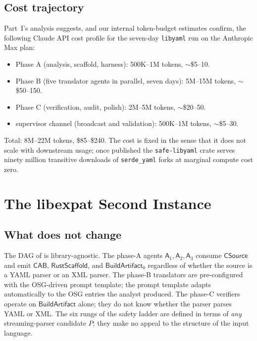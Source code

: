 \documentclass[12pt]{article}
\theoremstyle{definition}
\theoremstyle{remark}
\newcommand{\libyaml}{\texttt{libyaml}}
\newcommand{\safelibyaml}{\texttt{safe-libyaml}}
\newcommand{\Agent}[1]{\ensuremath{\mathsf{#1}}}
\newcommand{\Artifact}[1]{\ensuremath{\mathsf{#1}}}
\newcommand{\CSrc}{\Artifact{CSource}}
\newcommand{\CAB}{\Artifact{CAB}}
\newcommand{\Scaff}{\Artifact{RustScaffold}}
\newcommand{\BArt}{\Artifact{BuildArtifact}}
\begin{document}
\subsection{Cost trajectory}

Part~I's analysis suggests, and our internal token-budget estimates
confirm, the following Claude API cost profile for the seven-day
\libyaml{} run on the Anthropic Max plan:

\begin{itemize}
\item Phase A (analysis, scaffold, harness): 500K--1M tokens, $\sim$\$5--10.
\item Phase B (five translator agents in parallel, seven days):
  5M--15M tokens, $\sim$\$50--150.
\item Phase C (verification, audit, polish): 2M--5M tokens, $\sim$\$20--50.
\item supervisor channel (broadcast and validation):
  500K--1M tokens, $\sim$\$5--30.
\end{itemize}

\noindent Total: 8M--22M tokens, \$85--\$240. The cost is fixed in the
sense that it does not scale with downstream usage; once published the
\safelibyaml{} crate serves ninety million transitive downloads of
\texttt{serde\_yaml} forks at marginal compute cost zero.

\section{The libexpat Second Instance}
\label{sec:libexpat}

\subsection{What does not change}

The DAG of  is library-agnostic. The phase-A agents
\(\Agent{A}_1, \Agent{A}_2, \Agent{A}_3\) consume \CSrc{} and emit
\CAB, \Scaff, and \BArt$_0$ regardless of whether the source is a YAML
parser or an XML parser. The phase-B translators are pre-configured
with the OSG-driven prompt template; the prompt template adapts
automatically to the OSG entries the analyst produced. The phase-C
verifiers operate on \BArt{} alone; they do not know whether the parser
parses YAML or XML. The six rungs of the safety ladder are defined in
terms of \emph{any} streaming-parser candidate \(P\); they make no
appeal to the structure of the input language.
\end{document}
